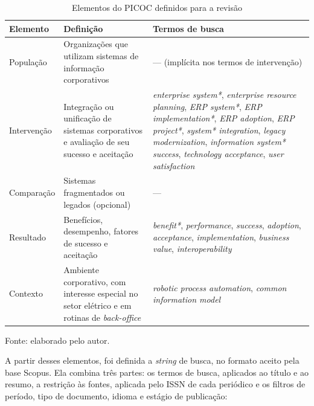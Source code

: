 \begin{table}[H]
\centering
\caption{Elementos do PICOC definidos para a revisão}
\label{tab:picoc}
\begin{tabularx}{\textwidth}{lXX}
\toprule
\textbf{Elemento} & \textbf{Definição} & \textbf{Termos de busca} \\ \midrule
População & Organizações que utilizam sistemas de informação corporativos & --- (implícita nos termos de intervenção) \\ \midrule
Intervenção & Integração ou unificação de sistemas corporativos e avaliação de seu sucesso e aceitação & \textit{enterprise system*}, \textit{enterprise resource planning}, \textit{ERP system*}, \textit{ERP implementation*}, \textit{ERP adoption}, \textit{ERP project*}, \textit{system* integration}, \textit{legacy modernization}, \textit{information system* success}, \textit{technology acceptance}, \textit{user satisfaction} \\ \midrule
Comparação & Sistemas fragmentados ou legados (opcional) & --- \\ \midrule
Resultado & Benefícios, desempenho, fatores de sucesso e aceitação & \textit{benefit*}, \textit{performance}, \textit{success}, \textit{adoption}, \textit{acceptance}, \textit{implementation}, \textit{business value}, \textit{interoperability} \\ \midrule
Contexto & Ambiente corporativo, com interesse especial no setor elétrico e em rotinas de \textit{back-office} & \textit{robotic process automation}, \textit{common information model} \\ \bottomrule
\end{tabularx}

\vspace{0.2cm}
{\footnotesize Fonte: elaborado pelo autor.}
\end{table}

A partir desses elementos, foi definida a \textit{string} de busca, no formato aceito pela base Scopus. Ela combina três partes: os termos de busca, aplicados ao título e ao resumo, a restrição às fontes, aplicada pelo ISSN de cada periódico e os filtros de período, tipo de documento, idioma e estágio de publicação:

